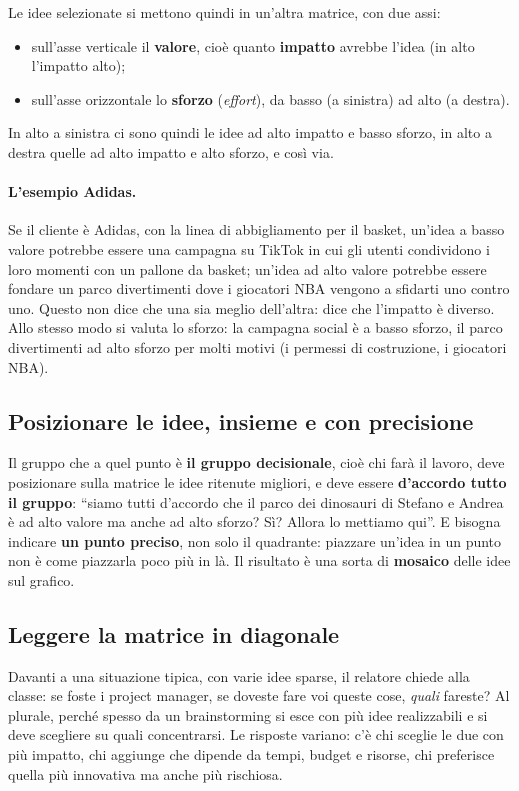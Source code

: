 Le idee selezionate si mettono quindi in un'altra matrice, con due assi:
\begin{itemize}
  \item sull'asse verticale il \textbf{valore}, cioè quanto \textbf{impatto} avrebbe
        l'idea (in alto l'impatto alto);
  \item sull'asse orizzontale lo \textbf{sforzo} (\emph{effort}), da basso (a sinistra)
        ad alto (a destra).
\end{itemize}
In alto a sinistra ci sono quindi le idee ad alto impatto e basso sforzo, in alto a
destra quelle ad alto impatto e alto sforzo, e così via.

\paragraph{L'esempio Adidas.} Se il cliente è Adidas, con la linea di abbigliamento per
il basket, un'idea a basso valore potrebbe essere una campagna su TikTok in cui gli
utenti condividono i loro momenti con un pallone da basket; un'idea ad alto valore
potrebbe essere fondare un parco divertimenti dove i giocatori NBA vengono a sfidarti
uno contro uno. Questo non dice che una sia meglio dell'altra: dice che l'impatto è
diverso. Allo stesso modo si valuta lo sforzo: la campagna social è a basso sforzo, il
parco divertimenti ad alto sforzo per molti motivi (i permessi di costruzione, i
giocatori NBA).

\subsection{Posizionare le idee, insieme e con precisione}

Il gruppo che a quel punto è \textbf{il gruppo decisionale}, cioè chi farà il lavoro,
deve posizionare sulla matrice le idee ritenute migliori, e deve essere \textbf{d'accordo
tutto il gruppo}: ``siamo tutti d'accordo che il parco dei dinosauri di Stefano e Andrea è
ad alto valore ma anche ad alto sforzo? Sì? Allora lo mettiamo qui''. E bisogna indicare
\textbf{un punto preciso}, non solo il quadrante: piazzare un'idea in un punto non è come
piazzarla poco più in là. Il risultato è una sorta di \textbf{mosaico} delle idee sul
grafico.

\subsection{Leggere la matrice in diagonale}

Davanti a una situazione tipica, con varie idee sparse, il relatore chiede alla classe:
se foste i project manager, se doveste fare voi queste cose, \emph{quali} fareste? Al
plurale, perché spesso da un brainstorming si esce con più idee realizzabili e si deve
scegliere su quali concentrarsi. Le risposte variano: c'è chi sceglie le due con più
impatto, chi aggiunge che dipende da tempi, budget e risorse, chi preferisce quella più
innovativa ma anche più rischiosa.

